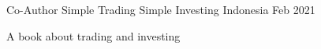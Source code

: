

\begin{cventries}

  \cventry
    {Co-Author} %
    {Simple Trading Simple Investing} %
    {Indonesia} %
    {Feb 2021} %
    {
      \begin{cvitems} %
        \item {A book about trading and investing}
      \end{cvitems}
    }

\end{cventries}
